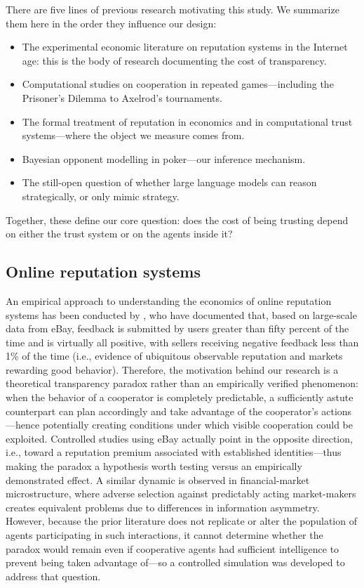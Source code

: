 \documentclass[10pt]{article} %
\begin{document}
There are five lines of previous research motivating this study. We
summarize them here in the order they influence our design:
\begin{itemize}\itemsep2pt
  \item The experimental economic literature on reputation systems in
  the Internet age: this is the body of research documenting the cost
  of transparency.
  \item Computational studies on cooperation in repeated
  games---including the Prisoner's Dilemma to Axelrod's tournaments.
  \item The formal treatment of reputation in economics and in
  computational trust systems---where the object we measure comes from.
  \item Bayesian opponent modelling in poker---our inference mechanism.
  \item The still-open question of whether large language models can
  reason strategically, or only mimic strategy.
\end{itemize}
Together, these define our core question: does the cost of being
trusting depend on either the trust system or on the agents inside
it?

\subsection{Online reputation systems}
An empirical approach to understanding the economics of online
reputation systems has been conducted by \citet{resnick2002trust}, who have documented that, based on
large-scale data from eBay, feedback is submitted by users greater
than fifty percent of the time and is virtually all positive, with
sellers receiving negative feedback less than 1\% of the time (i.e.,
evidence of ubiquitous observable reputation and markets rewarding
good behavior). Therefore, the motivation behind our research is a
theoretical transparency paradox rather than an empirically verified
phenomenon: when the behavior of a cooperator is completely
predictable, a sufficiently astute counterpart can plan accordingly
and take advantage of the cooperator's actions---hence potentially
creating conditions under which visible cooperation could be
exploited. Controlled studies using eBay actually point in the
opposite direction, i.e., toward a reputation premium associated with
established identities---thus making the paradox a hypothesis worth
testing versus an empirically demonstrated effect. A similar dynamic
is observed in financial-market microstructure, where adverse
selection against predictably acting market-makers
\citep{glosten1985bid} creates equivalent problems due to differences
in information asymmetry. However, because the prior literature does
not replicate or alter the population of agents participating in such
interactions, it cannot determine whether the paradox would remain
even if cooperative agents had sufficient intelligence to prevent
being taken advantage of---so a controlled simulation was developed
to address that question.
\end{document}
